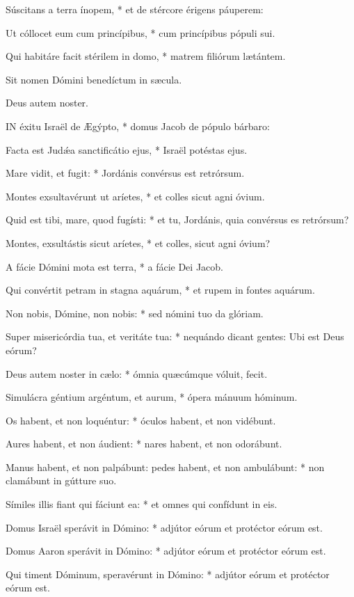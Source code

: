 Súscitans a terra ínopem, * et de stércore érigens páuperem:

Ut cóllocet eum cum princípibus, * cum princípibus pópuli sui.

Qui habitáre facit stérilem in domo, * matrem filiórum lætántem.

 Sit nomen Dómini benedíctum in sæcula.

 Deus autem noster.


\lettrine[lines=2]{I}{N} éxitu Israël de Ægýpto, * domus Jacob de pópulo bárbaro:

Facta est Judǽa sanctificátio ejus, * Israël potéstas ejus.

Mare vidit, et fugit: * Jordánis convérsus est retrórsum.

Montes exsultavérunt ut aríetes, * et colles sicut agni óvium.

Quid est tibi, mare, quod fugísti: * et tu, Jordánis, quia convérsus es retrórsum?

Montes, exsultástis sicut aríetes, * et colles, sicut agni óvium?

A fácie Dómini mota est terra, * a fácie Dei Jacob.

Qui convértit petram in stagna aquárum, * et rupem in fontes aquárum.

Non nobis, Dómine, non nobis: * sed nómini tuo da glóriam.

Super misericórdia tua, et veritáte tua: * nequándo dicant gentes: Ubi est Deus eórum?

Deus autem noster in cælo: * ómnia quæcúmque vóluit, fecit.

Simulácra géntium argéntum, et aurum, * ópera mánuum hóminum.

Os habent, et non loquéntur: * óculos habent, et non vidébunt.

Aures habent, et non áudient: * nares habent, et non odorábunt.

Manus habent, et non palpábunt: pedes habent, et non ambulábunt: * non clamábunt in gútture suo.

Símiles illis fiant qui fáciunt ea: * et omnes qui confídunt in eis.

Domus Israël sperávit in Dómino: * adjútor eórum et protéctor eórum est.

Domus Aaron sperávit in Dómino: * adjútor eórum et protéctor eórum est.

Qui timent Dóminum, speravérunt in Dómino: * adjútor eórum et protéctor eórum est.

